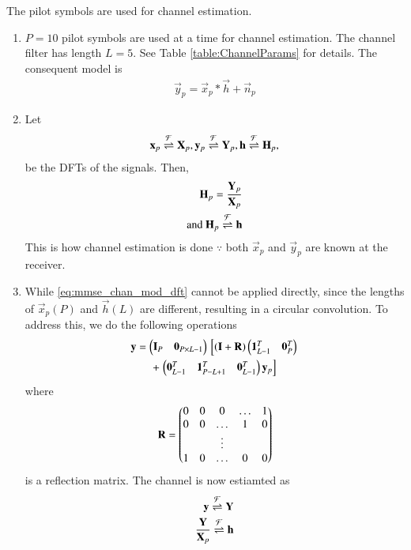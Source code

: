 The pilot symbols are used for channel estimation.
\begin{enumerate}[label=\thesubsection.\arabic*.,ref=\thesubsection.\theenumi]


\item $P=10$ pilot symbols are used at a time for channel estimation.  The channel filter has length $L=5$.  See Table \ref{table:ChannelParams} for  details.
The consequent model is
\begin{align}
\vec{y}_p = \vec{x}_p*\vec{h}+ \vec{n}_p
\label{eq:mmse_chan_mod}
\end{align}
\begin{table}[!h]
\centering

\caption{}
\label{table:ChannelParams}
\end{table}
\item Let
\begin{align}
\mathbf{x}_p \overset{\mathcal{F}}{ \rightleftharpoons} \mathbf{X}_p, 
\mathbf{y}_p \overset{\mathcal{F}}{ \rightleftharpoons} \mathbf{Y}_p, 
\mathbf{h} \overset{\mathcal{F}}{ \rightleftharpoons} \mathbf{H}_p, 
\end{align} 
be the DFTs of the signals.  Then, 
\begin{align}
\mathbf{H}_p = \frac{\mathbf{Y}_p}{\mathbf{X}_p}
\\
\text{and }\mathbf{H}_p \overset{\mathcal{F}}{ \rightleftharpoons} \mathbf{h}
\label{eq:mmse_chan_mod_dft}
\end{align} 
This is how channel estimation is done $\because$ both $\vec{x}_p$
and $\vec{y}_p$ are known at the receiver.
\item While \eqref{eq:mmse_chan_mod_dft} cannot be applied directly, since the lengths of $\vec{x}_p (P)$  and $\vec{h}(L)$ are different, resulting in a circular convolution.  To address this, we do the following operations
\begin{multline}
\mathbf{y} = \begin{pmatrix}\mathbf{I}_{P} & \mathbf{0}_{P\times L-1}\end{pmatrix}{}\left[
\left(\mathbf{I}+\mathbf{R}\right)\begin{pmatrix}\mathbf{1}_{L-1}^T   & \mathbf{0}_{P}^T \end{pmatrix}
\right.
\\
+{}\left.
\begin{pmatrix}\mathbf{0}_{L-1}^T & \mathbf{1}_{P-L+1}^T  & \mathbf{0}_{L-1}^T\end{pmatrix}\mathbf{y}_p\right]
\end{multline} 
where
\begin{align}
\mathbf{R} = \begin{pmatrix}
0 & 0 & 0 & \dots & 1
\\
0 & 0 & \dots & 1 & 0
\\
 & &\vdots & & 
\\
1 & 0 & \dots & 0 & 0
\end{pmatrix}
\label{eq:mmse_chan_mod_reflect}
\end{align} 
is a reflection matrix.
The channel is now estiamted as
\begin{align}
\mathbf{y} \overset{\mathcal{F}}{ \rightleftharpoons} \mathbf{Y}
\\
\frac{\mathbf{Y}}{\mathbf{X}_p} \overset{\mathcal{F}}{ \rightleftharpoons} \mathbf{h}
\label{eq:mmse_chan_mod_fft}
\end{align} 
\end{enumerate}
